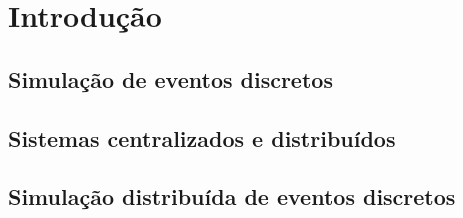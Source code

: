 \chapter{Introdução}


\section{Simulação de eventos discretos}
\section{Sistemas centralizados e distribuídos}
\section{Simulação distribuída de eventos discretos}
